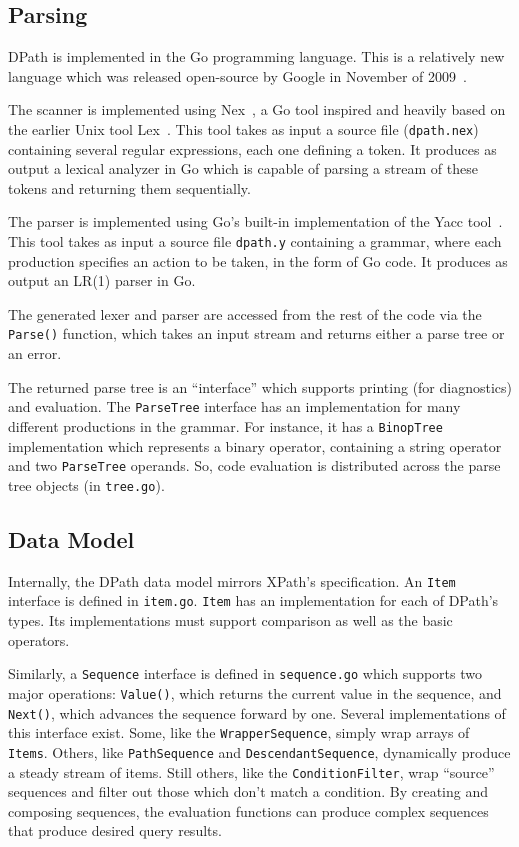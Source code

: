\documentclass{scrartcl}
\begin{document}
\subsection{Parsing}

DPath is implemented in the Go programming language. This is a relatively new
language which was released open-source by Google in November of
2009~\cite{golang}.

The scanner is implemented using Nex~\cite{nex}, a Go tool inspired and heavily
based on the earlier Unix tool Lex~\cite{lex}. This tool takes as input a source
file (\texttt{dpath.nex}) containing several regular expressions, each one
defining a token. It produces as output a lexical analyzer in Go which is
capable of parsing a stream of these tokens and returning them sequentially.

The parser is implemented using Go's built-in implementation of the Yacc
tool~\cite{yacc}. This tool takes as input a source file \texttt{dpath.y}
containing a grammar, where each production specifies an action to be taken, in
the form of Go code. It produces as output an LR(1) parser in Go.

The generated lexer and parser are accessed from the rest of the code via the
\texttt{Parse()} function, which takes an input stream and returns either a
parse tree or an error.

The returned parse tree is an ``interface'' which supports printing (for
diagnostics) and evaluation. The \texttt{ParseTree} interface has an
implementation for many different productions in the grammar. For instance, it
has a \texttt{BinopTree} implementation which represents a binary operator,
containing a string operator and two \texttt{ParseTree} operands. So, code
evaluation is distributed across the parse tree objects (in \texttt{tree.go}).

\subsection{Data Model}

Internally, the DPath data model mirrors XPath's specification. An \texttt{Item}
interface is defined in \texttt{item.go}. \texttt{Item} has an implementation
for each of DPath's types. Its implementations must support comparison as well
as the basic operators.

Similarly, a \texttt{Sequence} interface is defined in \texttt{sequence.go}
which supports two major operations: \texttt{Value()}, which returns the current
value in the sequence, and \texttt{Next()}, which advances the sequence forward
by one. Several implementations of this interface exist. Some, like the
\texttt{WrapperSequence}, simply wrap arrays of \texttt{Items}. Others, like
\texttt{PathSequence} and \texttt{DescendantSequence}, dynamically produce a
steady stream of items. Still others, like the \texttt{ConditionFilter}, wrap
``source'' sequences and filter out those which don't match a condition. By
creating and composing sequences, the evaluation functions can produce complex
sequences that produce desired query results.
\end{document}
